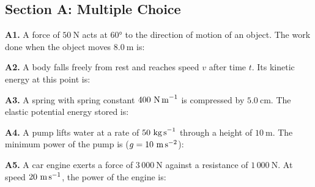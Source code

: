 \newpage
\begin{exercisebox}[5]

\subsection*{Section A: Multiple Choice}

\textbf{A1.} A force of $50\ \text{N}$ acts at $60°$
to the direction of motion of an object. The work done
when the object moves $8.0\ \text{m}$ is:


\vspace{0.4cm}

\textbf{A2.} A body falls freely from rest and reaches
speed $v$ after time $t$. Its kinetic energy at this
point is:


\vspace{0.4cm}

\textbf{A3.} A spring with spring constant
$400\ \text{N\,m}^{-1}$ is compressed by $5.0\ \text{cm}$.
The elastic potential energy stored is:


\vspace{0.4cm}

\textbf{A4.} A pump lifts water at a rate of
$50\ \text{kg\,s}^{-1}$ through a height of $10\ \text{m}$.
The minimum power of the pump is
($g = 10\ \text{m\,s}^{-2}$):


\vspace{0.4cm}

\textbf{A5.} A car engine exerts a force of
$3\,000\ \text{N}$ against a resistance of
$1\,000\ \text{N}$. At speed $20\ \text{m\,s}^{-1}$,
the power of the engine is:



\end{exercisebox}
